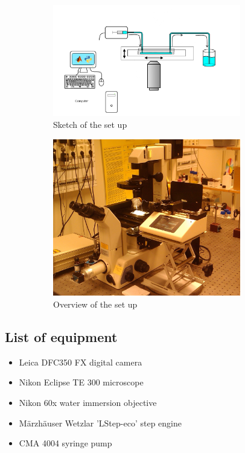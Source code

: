 \begin{figure}[H]
\centering
\begin{subfigure}[b]{0.45\textwidth}
\includegraphics[width=0.9\textwidth]{figures/method/setupsketch.png}
\caption{Sketch of the set up}\label{fig:setupsketch}
\end{subfigure}
\begin{subfigure}[b]{0.45\textwidth}
\includegraphics[width=0.9\textwidth]{figures/method/ExperimentalOverview.jpg}
\caption{Overview of the set up}\label{fig:setuppicture}
\end{subfigure}
\caption{}
\label{fig:experimentalsetup}
\end{figure}

\subsection{List of equipment}

\begin{itemize}
\item Leica DFC350 FX digital camera 
\item Nikon Eclipse TE 300 microscope
\item Nikon 60x water immersion objective
\item Märzhäuser Wetzlar 'LStep-eco' step engine
\item CMA 4004 syringe pump
\end{itemize}


